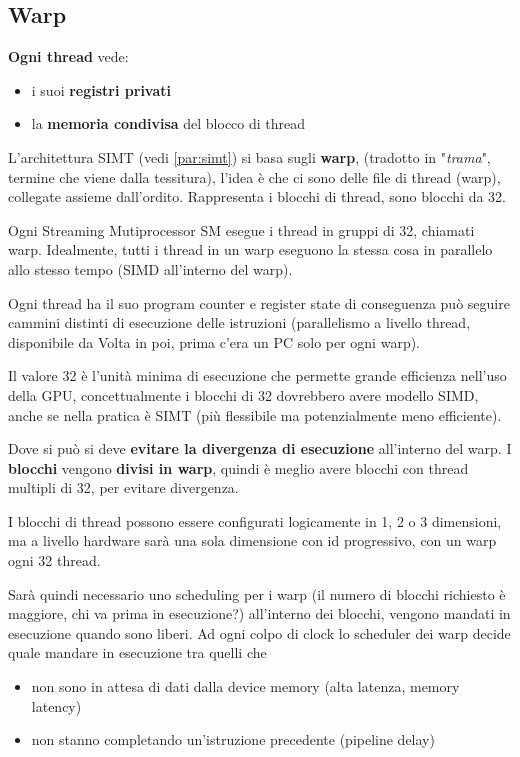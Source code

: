 
\subsection{Warp}

\textbf{Ogni thread} vede: 
\begin{itemize}
	\item i suoi \textbf{registri privati}
	\item la \textbf{memoria condivisa} del blocco di thread
\end{itemize}

L'architettura SIMT (vedi \ref{par:simt}) si basa sugli \textbf{warp}, (tradotto in "\textit{trama}", termine che viene dalla tessitura), l'idea è che ci sono delle file di thread (warp), collegate assieme dall'ordito. Rappresenta i blocchi di thread, sono blocchi da 32. 

Ogni Streaming Mutiprocessor SM esegue i thread in gruppi di 32, chiamati warp. Idealmente, tutti i thread in un warp eseguono la stessa cosa in parallelo allo stesso tempo (SIMD all'interno del warp).

Ogni thread ha il suo program counter e register state di conseguenza può seguire cammini distinti di esecuzione delle istruzioni (parallelismo a livello thread, disponibile da Volta in poi, prima c'era un PC solo per ogni warp).

Il valore 32 è l'unità minima di esecuzione che permette grande efficienza nell'uso della GPU, concettualmente i blocchi di 32 dovrebbero avere modello SIMD, anche se nella pratica è SIMT (più flessibile ma potenzialmente meno efficiente). 

Dove si può si deve \textbf{evitare la divergenza di esecuzione} all'interno del warp. I \textbf{blocchi} vengono \textbf{divisi in warp}, quindi è meglio avere blocchi con thread multipli di 32, per evitare divergenza.

I blocchi di thread possono essere configurati logicamente in 1, 2 o 3 dimensioni, ma a livello hardware sarà una sola dimensione con id progressivo, con un warp ogni 32 thread.

Sarà quindi necessario uno scheduling per i warp (il numero di blocchi richiesto è maggiore, chi va prima in esecuzione?) all'interno dei blocchi, vengono mandati in esecuzione quando sono liberi. Ad ogni colpo di clock lo scheduler dei warp decide quale mandare in esecuzione tra quelli che
\begin{itemize}
	\item non sono in attesa di dati dalla device memory (alta latenza, memory latency)
	
	\item non stanno completando un'istruzione precedente (pipeline delay)
\end{itemize}

